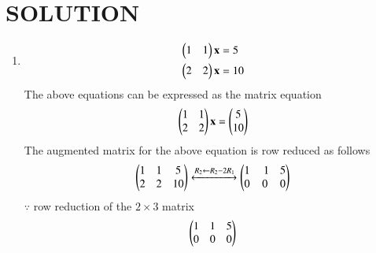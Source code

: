 \documentclass[journal,12pt,twocolumn]{IEEEtran}
\begin{document}
\section{SOLUTION}  
\begin{enumerate}
\item
\begin{align}
\begin{split}
\begin{pmatrix}1 & 1 \end{pmatrix}\mathbf{x}&=5
\\
\begin{pmatrix}2 & 2 \end{pmatrix}\mathbf{x}&=10
\end{split}
\end{align}
The above equations can be expressed as the matrix equation
\begin{align}
\begin{pmatrix}1 & 1\\2 & 2\end{pmatrix} \mathbf{x} = \begin{pmatrix}5\\10\end{pmatrix}
\end{align}
%
The augmented matrix for the above equation is row reduced as follows
\begin{align}
\begin{pmatrix}1 & 1 & 5\\2 & 2 & 10\end{pmatrix} 
\xleftrightarrow {R_2\leftarrow R_2 -2R_1}\begin{pmatrix}1 & \ 1 & 5 \\0 & 0 & 0 \end{pmatrix}
\end{align}
%
$\because$ row reduction of the $2\times 3$ matrix
%
\begin{align}
\myvec{1 & 1 & 5\\0 & 0 & 0} 


\end{align}
\end{enumerate}
\end{document}
